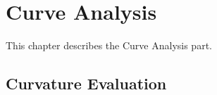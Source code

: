 \chapter{Curve Analysis}
\label{curveanalysis}

This chapter describes the Curve Analysis part.

\section{Curvature Evaluation}

\pgsbreak

\pgsbreak

\pgsbreak

\pgsbreak

\pgsbreak
